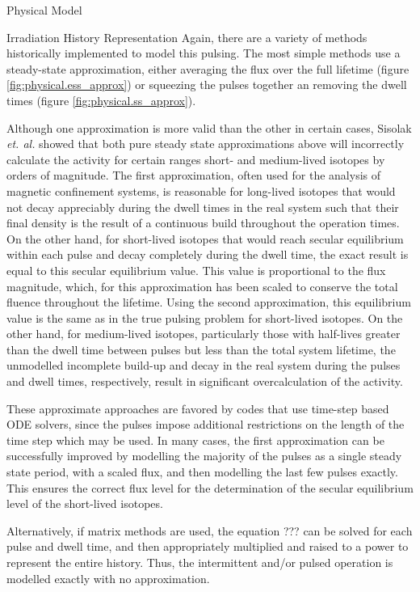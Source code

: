 \begin{chapter}{Physical Model\label{chap:physical}}
\begin{section}{Irradiation History Representation}
  Again, there are a variety of methods historically implemented to
  model this pulsing.  The most simple methods use a steady-state
  approximation, either averaging the flux over the full lifetime
  (figure \ref{fig:physical.ess_approx}) or squeezing the pulses
  together an removing the dwell times (figure
  \ref{fig:physical.ss_approx}).
  
  Although one approximation is more valid than the other in certain
  cases, Sisolak {\em et. al.}\cite{bib:PULSAR} showed that both pure
  steady state approximations above will incorrectly calculate the
  activity for certain ranges short- and medium-lived isotopes by
  orders of magnitude.  The first approximation, often used for the
  analysis of magnetic confinement systems, is reasonable for
  long-lived isotopes that would not decay appreciably during the
  dwell times in the real system such that their final density is the
  result of a continuous build throughout the operation times.  On the
  other hand, for short-lived isotopes that would reach secular
  equilibrium within each pulse and decay completely during the dwell
  time, the exact result is equal to this secular equilibrium value.
  This value is proportional to the flux magnitude, which, for this
  approximation has been scaled to conserve the total fluence
  throughout the lifetime.  Using the second approximation, this
  equilibrium value is the same as in the true pulsing problem for
  short-lived isotopes.  On the other hand, for medium-lived isotopes,
  particularly those with half-lives greater than the dwell time
  between pulses but less than the total system lifetime, the
  unmodelled incomplete build-up and decay in the real system during
  the pulses and dwell times, respectively, result in significant
  overcalculation of the activity.

  These approximate approaches are favored by codes that use time-step
  based ODE solvers, since the pulses impose additional restrictions
  on the length of the time step which may be used.  In many cases,
  the first approximation can be successfully improved by modelling
  the majority of the pulses as a single steady state period, with a
  scaled flux, and then modelling the last few pulses exactly.  This
  ensures the correct flux level for the determination of the secular
  equilibrium level of the short-lived isotopes.
  
  Alternatively, if matrix methods are used, the equation ??? can be
  solved for each pulse and dwell time, and then appropriately
  multiplied and raised to a power to represent the entire history.
  Thus, the intermittent and/or pulsed operation is modelled exactly
  with no approximation.


\end{section}
\end{chapter}
